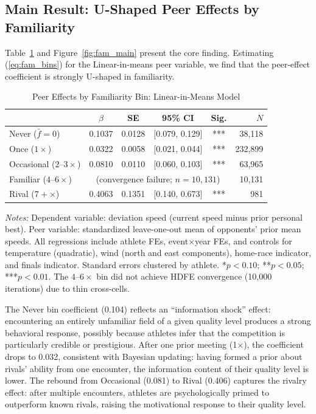 \documentclass[12pt]{article}
\theoremstyle{definition}
\theoremstyle{remark}
\begin{document}
\subsection{Main Result: U-Shaped Peer Effects by Familiarity}
\label{subsec:main_result}

Table~\ref{tab:fam_bins} and Figure~\ref{fig:fam_main} present the core finding.
Estimating (\ref{eq:fam_bins}) for the Linear-in-means peer variable, we find
that the peer-effect coefficient is strongly U-shaped in familiarity.

\begin{table}[H]
\centering
\begin{threeparttable}
\caption{Peer Effects by Familiarity Bin: Linear-in-Means Model}
\label{tab:fam_bins}
\begin{tabular}{lccccr}
\toprule
 & $\hat\beta$ & SE & 95\% CI & Sig. & $N$ \\
\midrule
Never ($\bar{f}=0$)           & 0.1037 & 0.0128 & [0.079, 0.129] & *** & 38,118 \\
Once ($1\times$)              & 0.0322 & 0.0058 & [0.021, 0.044] & *** & 232,899 \\
Occasional ($2$--$3\times$)   & 0.0810 & 0.0110 & [0.060, 0.103] & *** & 63,965 \\
Familiar ($4$--$6\times$)     & \multicolumn{4}{c}{(convergence failure; $n = 10{,}131$)} & 10,131 \\
Rival ($7+\times$)            & 0.4063 & 0.1351 & [0.140, 0.673] & *** & 981 \\
\bottomrule
\end{tabular}
\begin{tablenotes}
\small
\item \textit{Notes:} Dependent variable: deviation speed (current speed minus prior personal best).
Peer variable: standardized leave-one-out mean of opponents' prior mean speeds.
All regressions include athlete FEs, event$\times$year FEs, and controls for temperature (quadratic),
wind (north and east components), home-race indicator, and finals indicator.
Standard errors clustered by athlete. *$p<0.10$; **$p<0.05$; ***$p<0.01$.
The $4$--$6\times$ bin did not achieve HDFE convergence (10{,}000 iterations) due to thin cross-cells.
\end{tablenotes}
\end{threeparttable}
\end{table}

The Never bin coefficient (0.104) reflects an ``information shock'' effect:
encountering an entirely unfamiliar field of a given quality level produces a strong
behavioral response, possibly because athletes infer that the competition is
particularly credible or prestigious.
After one prior meeting (1$\times$), the coefficient drops to 0.032, consistent
with Bayesian updating: having formed a prior about rivals' ability from one
encounter, the information content of their quality level is lower.
The rebound from Occasional (0.081) to Rival (0.406) captures the rivalry
effect: after multiple encounters, athletes are psychologically primed to
outperform known rivals, raising the motivational response to their quality level.
\end{document}
